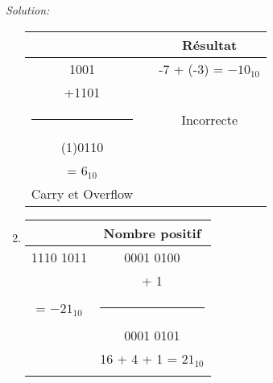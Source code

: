 \documentclass{article}
\newenvironment{solution}
    {\textit{Solution:}}
    {}
\begin{document}
\begin{solution}
\begin{enumerate}
        \begin{tabular}{|c|c|c|}
        \hline
        &  & Résultat \\
        \hline
        \hspace{6pt}1001       &                         &       -7 + (-3) = $-10_{10}$         \\
        +1101                  &               &                                         \\
        \rule{1in}{1pt}             &                  &       Incorrecte                          \\
        (1)0110                &                        &                                         \\
        \hspace{33pt}  = $6_{10}$ \hspace{38pt}  &          &                                   \\
        Carry et Overflow                       &       \hspace{100pt}              &      \hspace{100pt}   \\
        \hline
        \end{tabular}
        
        
        \item
        
        
        \begin{tabular}{|c|c|}
        \hline
        & Nombre positif\\
        \hline    
        1110 1011           &       0001 0100                   \\
        \hspace{101pt}      &       + \hspace{25pt} 1           \\
        = $-21_{10}$        &       \rule{1in}{1pt}             \\
        \hspace{5pt}        &       0001 0101                   \\
        \hspace{5pt}        &       16 + 4 + 1 = $21_{10}$      \\
                            &       \hspace{100pt}              \\
        \hline
        \end{tabular}
        
        \hspace{40pt}
        

\end{enumerate}
\end{solution}
\end{document}
